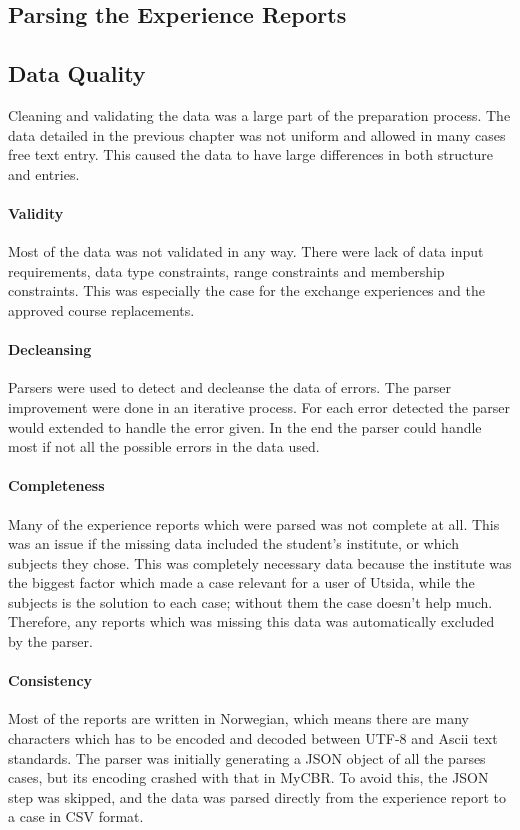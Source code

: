 \subsection{Parsing the Experience Reports}

\subsection{Data Quality}
Cleaning and validating the data was a large part of the preparation process. The data detailed in the previous chapter was not uniform and allowed in many cases free text entry. This caused the data to have large differences in both structure and entries. 

\paragraph{Validity} Most of the data was not validated in any way. There were lack of data input requirements, data type constraints, range constraints and membership constraints. This was especially the case for the exchange experiences and the approved course replacements.


\paragraph{Decleansing} Parsers were used to detect and decleanse the data of errors. The parser improvement were done in an iterative process. For each error detected the parser would extended to handle the error given. In the end the parser could handle most if not all the possible errors in the data used. 

\paragraph{Completeness}
Many of the experience reports which were parsed was not complete at all. This was an issue if the missing data included the student's institute, or which subjects they chose. This was completely necessary data because the institute was the biggest factor which made a case relevant for a user of Utsida, while the subjects is the solution to each case; without them the case doesn't help much. Therefore, any reports which was missing this data was automatically excluded by the parser.

\paragraph{Consistency}
Most of the reports are written in Norwegian, which means there are many characters which has to be encoded and decoded between UTF-8 and Ascii text standards. The parser was initially generating a JSON object of all the parses cases, but its encoding crashed with that in MyCBR. To avoid this, the JSON step was skipped, and the data was parsed directly from the experience report to a case in CSV format.

